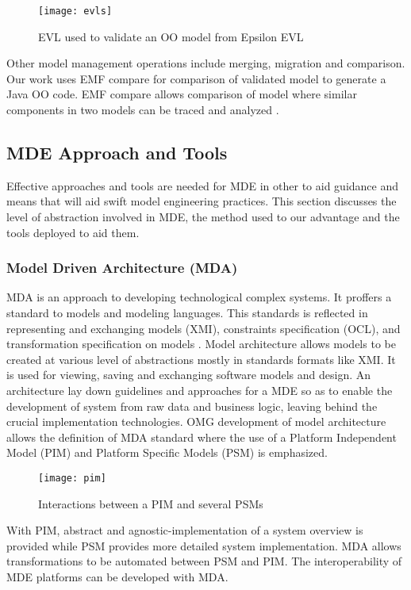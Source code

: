 \documentclass[12pt, a4paper]{report}
\begin{document}
\begin{figure}[!ht]
  \centering
   \texttt{[image: evls]}
  \caption{EVL used to validate an OO model from Epsilon EVL}
  \label{fig:mrad}
\end{figure}


Other model management operations include merging, migration and comparison. Our work uses EMF compare for comparison of validated model to generate a Java OO code. EMF compare allows comparison of model where similar components in two models can be traced and analyzed \cite{Pierantonio2008}.  

\subsection{MDE Approach and Tools}
Effective approaches and tools are needed for MDE in other to aid guidance and means that will aid swift model engineering practices. This section discusses the level of abstraction involved in MDE, the method used to our advantage and the tools deployed to aid them.

\subsubsection{Model Driven Architecture (MDA)}  
MDA is an approach to developing technological complex systems. It proffers a standard to models and modeling languages. This standards is reflected in representing and exchanging models (XMI), constraints specification (OCL), and transformation specification on models \cite{so62484}. Model architecture allows models to be created at various level of abstractions mostly in standards formats like XMI. It is used for viewing, saving and exchanging software models and design. An architecture lay down guidelines and approaches for a MDE so as to enable the development of system from raw data and business logic, leaving behind the crucial implementation technologies. OMG development of model architecture allows the definition of MDA standard where the use of a Platform Independent Model (PIM) and Platform Specific Models (PSM) is emphasized. 

\begin{figure}[!ht]
  \centering
   \texttt{[image: pim]}
  \caption{Interactions between a PIM and several PSMs}
  \label{fig:mrad}
\end{figure}

With PIM, abstract and agnostic-implementation of a system overview is provided while PSM provides more detailed system implementation. MDA allows transformations to be automated between PSM and PIM.  The interoperability of MDE platforms can be developed with MDA. 
\end{document}
